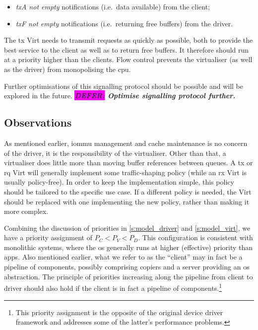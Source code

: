 \documentclass[a4paper,12pt]{report}
\newcommand{\DEFER}[1]{\textbf{\textsl{\colorbox{magenta}{DEFER:} #1}}}
\newcommand{\DEFER}[1]{\relax}
\begin{document}
\begin{itemize}
\item \emph{\gls{tx}A not empty} notifications (i.e.\ data available) from
  the client;
\item \emph{\gls{tx}F not empty} notifications (i.e.\ returning free
  buffers) from the driver.
\end{itemize}

The \gls{tx} Virt needs to transmit requests as quickly as possible, both to
provide the best service to the client as well as to return free
buffers. It therefore should run at a priority higher than the
clients. Flow control prevents the virtualiser (as well as the driver)
from monopolising the \gls{cpu}.

Further optimisations of this signalling protocol should be possible
and will be explored in the future. \DEFER{Optimise signalling
  protocol further.}

\subsection{Observations}\label{s:mux}
As mentioned earlier, \gls{iommu} management and cache maintenance is no concern of the
driver, it is the responsibility of the virtualiser.
Other than that,
a virtualiser does little more than moving buffer references between
queues.  A
\gls{tx} or \gls{rq} Virt will generally implement some traffic-shaping policy
(while an \gls{rx} Virt is usually policy-free).
In order to keep the implementation simple, this policy should be
tailored to the specific use case. If a different policy is needed,
the Virt should be replaced with one implementing the new policy,
rather than making it more complex.

Combining the discussion of priorities in \autoref{s:model_driver} and \autoref{s:model_virt},
we have a priority assignment of \(P_C<P_V<P_D\).
This configuration is consistent
with monolithic systems, where the \gls{os} generally runs at higher
(effective) priority than apps.
Also mentioned earlier, what we refer to as the ``client'' may in fact
be a pipeline of components, possibly comprising
copiers and a server providing an \gls{os} abstraction.  The principle of priorities increasing along
the pipeline from client to driver should also hold if the client is
in fact a pipeline of components.\footnote{This
  priority assignment is the opposite of the original device driver
  framework and addresses some of the latter's performance problems.}
\end{document}
